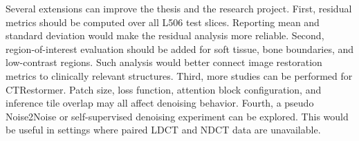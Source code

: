 Several extensions can improve the thesis and the research project. First, residual metrics should be computed over all L506 test slices. Reporting mean and standard deviation would make the residual analysis more reliable. Second, region-of-interest evaluation should be added for soft tissue, bone boundaries, and low-contrast regions. Such analysis would better connect image restoration metrics to clinically relevant structures. Third, more studies can be performed for CTRestormer. Patch size, loss function, attention block configuration, and inference tile overlap may all affect denoising behavior. Fourth, a pseudo Noise2Noise or self-supervised denoising experiment can be explored. This would be useful in settings where paired LDCT and NDCT data are unavailable. 
